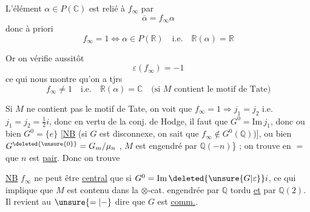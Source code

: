 L'élément $\alpha\in P(\mathbb C)$ est relié à $f_\infty$ par
\[
\overline\alpha=f_\infty\alpha
\]
donc  à priori
\[
f_\infty=1\Longleftrightarrow\alpha\in P(\mathbb R)\quad\text{i.e.}\quad\mathbb R(\alpha)=\mathbb R
\]


Or on vérifie aussitôt
\[
\boxed{\varepsilon(f_\infty)=-1}
\]
ce qui nous montre qu'on a tjrs
\[
\boxed{f_\infty\ne1\quad\text{i.e.}\quad\mathbb R(\alpha)=\mathbb C}
\quad\text{(si $M$ contient le motif de Tate)}
\]

Si $M$ ne contient pas le motif de Tate, on voit
que $f_\infty=1\Longrightarrow j_1=j_2$ i.e. $j_1=j_2=\frac12 i$, donc en
vertu de la conj. de Hodge, il faut que
$G^0=\mathrm{Im}\,j_1$, donc ou bien $G^0=\{e\}$  
[\uline{NB} (si $G$ est disconnexe, on sait que
$f_\infty\notin G^0(\mathbb Q)$)], ou bien $G^{\deleted{\unsure{0}}}=G_m/\mu_n$ ,
$M$ est  engendré par $\mathbb Q(-n)$\} ; on trouve
en $=$  que $n$ est \uline{pair}. Donc on trouve



\uline{NB} $f_\infty$ ne peut être \uline{central} que si $G^0=\mathrm{Im}\,\deleted{\unsure{G|\varepsilon}}i$, ce qui
implique que $M$ est  contenu dans la
$\otimes$-cat. engendrée par $\mathbb Q$ tordu \uline{et} par $\mathbb Q(2)$.
Il revient au $\unsure{=|{-}}$ dire que $G$ est \uline{comm.}.
